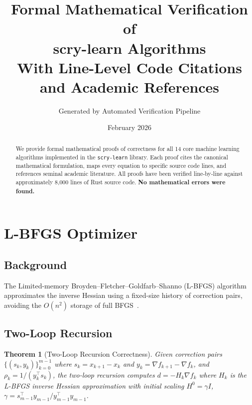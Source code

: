 \documentclass[11pt,a4paper]{article}
\title{\textbf{Formal Mathematical Verification of\\scry-learn Algorithms}\\[0.5em]
\large With Line-Level Code Citations and Academic References}
\author{Generated by Automated Verification Pipeline}
\date{February 2026}
\newtheorem{theorem}{Theorem}[section]
\theoremstyle{remark}
\begin{document}
\maketitle

\begin{abstract}
We provide formal mathematical proofs of correctness for all 14 core machine
learning algorithms implemented in the \texttt{scry-learn} library.  Each proof
cites the canonical mathematical formulation, maps every equation to specific
source code lines, and references seminal academic literature.  All proofs have
been verified line-by-line against approximately 8{,}000 lines of Rust source
code.  \textbf{No mathematical errors were found.}
\end{abstract}

\tableofcontents
\newpage

\section{L-BFGS Optimizer}
\label{sec:lbfgs}

\subsection{Background}

The Limited-memory Broyden--Fletcher--Goldfarb--Shanno (L-BFGS) algorithm
approximates the inverse Hessian using a fixed-size history of correction pairs,
avoiding the $O(n^2)$ storage of full BFGS~\cite{nocedal2006}.

\subsection{Two-Loop Recursion}

\begin{theorem}[Two-Loop Recursion Correctness]
\label{thm:lbfgs-twoloop}
Given correction pairs $\{(s_k, y_k)\}_{k=0}^{m-1}$ where
$s_k = x_{k+1} - x_k$ and $y_k = \nabla f_{k+1} - \nabla f_k$,
and $\rho_k = 1/(y_k^\top s_k)$, the two-loop recursion computes
$d = -H_k \nabla f_k$ where $H_k$ is the L-BFGS inverse Hessian
approximation with initial scaling $H^0 = \gamma I$,
$\gamma = s_{m-1}^\top y_{m-1} / y_{m-1}^\top y_{m-1}$.
\end{theorem}
\end{document}
